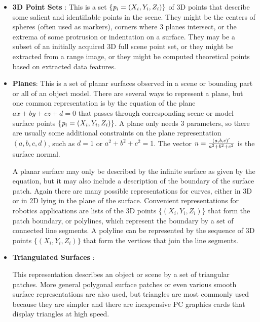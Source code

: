 \documentclass[twocolumn,oneside]{book}
\begin{document}
\begin{itemize}

\item {\bf 3D Point Sets }: 
This is a set $\{ {\bf \it p}_i = (X_i,Y_i,Z_i)\}$ of 3D points that
describe some salient and identifiable points in the scene.
They might be the centers of spheres (often used as markers),
corners where 3 planes intersect, or the extrema of some protrusion
or indentation on a surface.
They may be a subset of an initially acquired 3D full scene point set,
or they might be extracted from a range image, or they might be computed
theoretical points based on extracted data features.

\item {\bf Planes}: 
This is a set of planar surfaces observed in a scene or bounding 
part or all of an object model.
There are several ways to represent a plane, but one common representation
is by the equation of the plane $ax + by + cz +d = 0$ that
passes through corresponding scene or model surface points 
$\{ {\bf \it p}_i = (X_i,Y_i,Z_i)\}$.
A plane only needs 3 parameters, so there are usually some additional
constraints on the plane representation $(a,b,c,d)$, such as $d=1$ or
$a^2 + b^2 + c^2 = 1$. The vector ${\bf \it n} = \frac{(a,b,c)'}{a^2+b^2+c^2}$ 
is the surface normal.

A planar surface may only be described by the infinite surface as given by the
equation, but it may also include a description of the boundary of the
surface patch.
Again there are many possible representations for curves, either in 3D or
in 2D lying in the plane of the surface.
Convenient representations for robotics applications are lists of  
the 3D points $\{(X_i,Y_i,Z_i)\}$ that form the patch boundary, or
polylines, which represent the boundary by a set of connected line segments.
A polyline can be represented by the sequence of 3D points $\{(X_i,Y_i,Z_i)\}$ 
that form the vertices that join the line segments.

\item {\bf Triangulated Surfaces }:

This representation describes an object or scene by a set of triangular 
patches. More general polygonal surface patches or even various smooth
surface representations are also used, but triangles are most commonly used
because they are simpler and there are inexpensive PC graphics cards that
display triangles at high speed.



\end{itemize}
\end{document}
